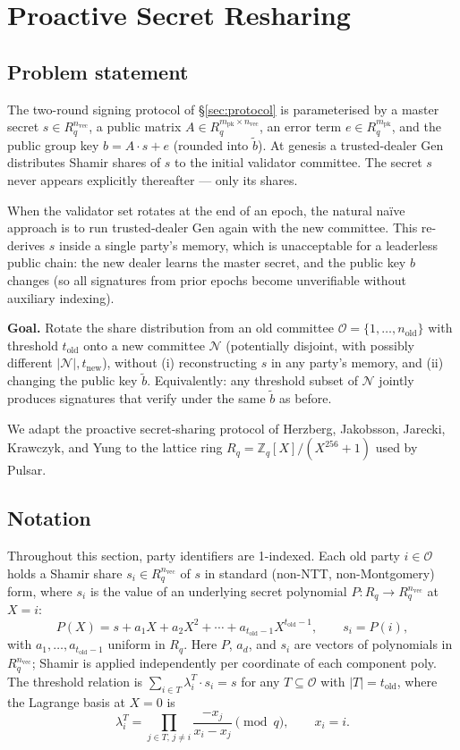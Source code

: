 \section{Proactive Secret Resharing}
\label{sec:resharing}

\subsection{Problem statement}

The two-round signing protocol of \S\ref{sec:protocol} is parameterised by a master secret $s \in R_q^{n_{\textrm{vec}}}$, a public matrix $A \in R_q^{m_{\textrm{pk}} \times n_{\textrm{vec}}}$, an error term $e \in R_q^{m_{\textrm{pk}}}$, and the public group key $b = A \cdot s + e$ (rounded into $\tilde b$). At genesis a trusted-dealer Gen distributes Shamir shares of $s$ to the initial validator committee. The secret $s$ never appears explicitly thereafter --- only its shares.

When the validator set rotates at the end of an epoch, the natural na\"{i}ve approach is to run trusted-dealer Gen again with the new committee. This re-derives $s$ inside a single party's memory, which is unacceptable for a leaderless public chain: the new dealer learns the master secret, and the public key $b$ changes (so all signatures from prior epochs become unverifiable without auxiliary indexing).

\textbf{Goal.} Rotate the share distribution from an old committee $\mathcal{O} = \{1, \dots, n_{\mathrm{old}}\}$ with threshold $t_{\mathrm{old}}$ onto a new committee $\mathcal{N}$ (potentially disjoint, with possibly different $|\mathcal{N}|, t_{\mathrm{new}}$), without (i) reconstructing $s$ in any party's memory, and (ii) changing the public key $\tilde b$. Equivalently: any threshold subset of $\mathcal{N}$ jointly produces signatures that verify under the same $\tilde b$ as before.

We adapt the proactive secret-sharing protocol of Herzberg, Jakobsson, Jarecki, Krawczyk, and Yung \cite{hjky97} to the lattice ring $R_q = \mathbb{Z}_q[X]/(X^{256} + 1)$ used by Pulsar.

\subsection{Notation}

Throughout this section, party identifiers are 1-indexed. Each old party $i \in \mathcal{O}$ holds a Shamir share $s_i \in R_q^{n_{\textrm{vec}}}$ of $s$ in standard (non-NTT, non-Montgomery) form, where $s_i$ is the value of an underlying secret polynomial $P : R_q \to R_q^{n_{\textrm{vec}}}$ at $X = i$:
\[
P(X) = s + a_1 X + a_2 X^2 + \cdots + a_{t_{\mathrm{old}} - 1} X^{t_{\mathrm{old}} - 1}, \qquad s_i = P(i),
\]
with $a_1, \dots, a_{t_{\mathrm{old}}-1}$ uniform in $R_q$. Here $P$, $a_d$, and $s_i$ are vectors of polynomials in $R_q^{n_{\textrm{vec}}}$; Shamir is applied independently per coordinate of each component poly. The threshold relation is $\sum_{i \in T} \lambda_i^T \cdot s_i = s$ for any $T \subseteq \mathcal{O}$ with $|T| = t_{\mathrm{old}}$, where the Lagrange basis at $X = 0$ is
\[
\lambda_i^T = \prod_{j \in T,\, j \neq i} \frac{-x_j}{x_i - x_j} \pmod{q}, \qquad x_i = i.
\]


